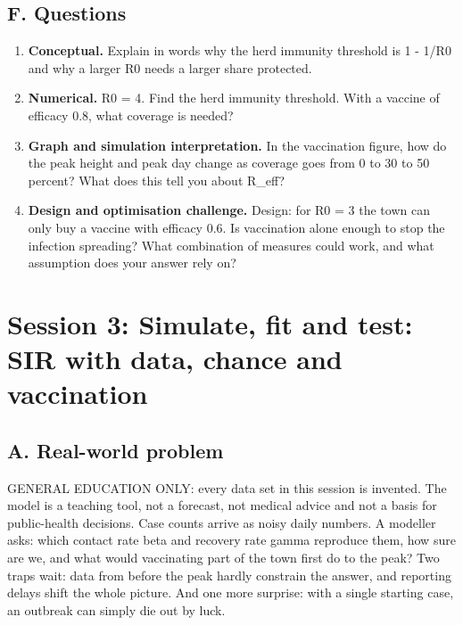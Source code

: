 \documentclass[11pt,a4paper]{article}
\begin{document}
\subsection*{F. Questions}
\begin{enumerate}[nosep]
\item \textbf{Conceptual.} Explain in words why the herd immunity threshold is 1 - 1/R0 and why a larger R0 needs a larger share protected.
\item \textbf{Numerical.} R0 = 4. Find the herd immunity threshold. With a vaccine of efficacy 0.8, what coverage is needed?
\item \textbf{Graph and simulation interpretation.} In the vaccination figure, how do the peak height and peak day change as coverage goes from 0 to 30 to 50 percent? What does this tell you about R\_eff?
\item \textbf{Design and optimisation challenge.} Design: for R0 = 3 the town can only buy a vaccine with efficacy 0.6. Is vaccination alone enough to stop the infection spreading? What combination of measures could work, and what assumption does your answer rely on?
\end{enumerate}

\section{Session 3: Simulate, fit and test: SIR with data, chance and vaccination}

\subsection*{A. Real-world problem}
GENERAL EDUCATION ONLY: every data set in this session is invented. The model is a teaching tool, not a forecast, not medical advice and not a basis for public-health decisions. Case counts arrive as noisy daily numbers. A modeller asks: which contact rate beta and recovery rate gamma reproduce them, how sure are we, and what would vaccinating part of the town first do to the peak? Two traps wait: data from before the peak hardly constrain the answer, and reporting delays shift the whole picture. And one more surprise: with a single starting case, an outbreak can simply die out by luck.
\end{document}
